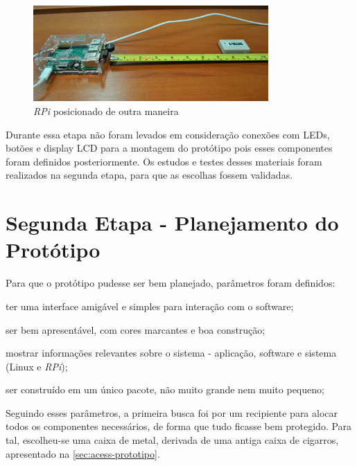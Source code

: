 \begin{figure}[htb]
	\caption{\label{fig:posiciona-rpi}\textit{RPi} posicionado de outra maneira}
	\begin{center}
		\includegraphics[width=0.8\textwidth]{img/ambiente2.jpg}
	\end{center}
\end{figure}

Durante essa etapa não foram levados em consideração conexões com LEDs, botões e display LCD para a montagem do protótipo pois esses componentes foram definidos posteriormente. Os estudos e testes desses materiais foram realizados na segunda etapa, para que as escolhas fossem validadas.

\section{Segunda Etapa - Planejamento do Protótipo}\label{sec:segunda-etapa}

Para que o protótipo pudesse ser bem planejado, parâmetros foram definidos:

\begin{alineas}
	\item ter uma interface amigável e simples para interação com o software;
	\item ser bem apresentável, com cores marcantes e boa construção;
	\item mostrar informações relevantes sobre o sistema - aplicação, software e sistema (Linux e \textit{RPi});
	\item ser construído em um único pacote, não muito grande nem muito pequeno;
\end{alineas}

Seguindo esses parâmetros, a primeira busca foi por um recipiente para alocar todos os componentes necessários, de forma que tudo ficasse bem protegido. Para tal, escolheu-se uma caixa de metal, derivada de uma antiga caixa de cigarros, apresentado na \autoref{sec:acess-prototipo}.

